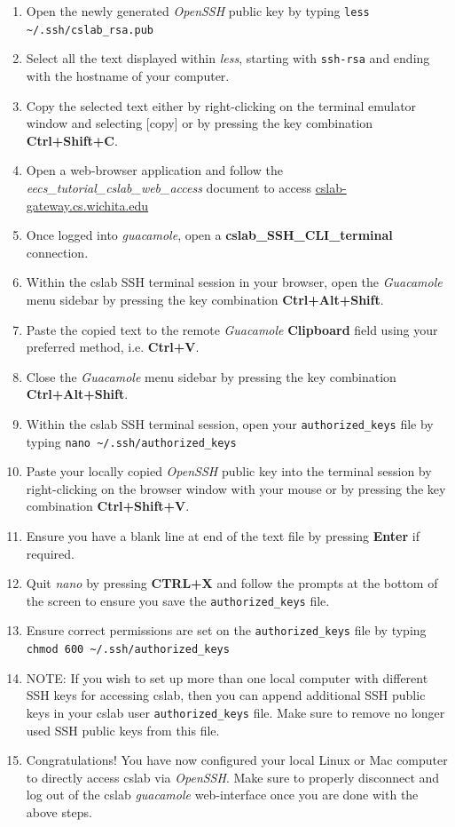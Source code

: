 \documentclass[12pt]{article}
\begin{document}
\begin{flushleft}
\begin{enumerate}
  \item Open the newly generated \textit{OpenSSH} public key by typing \break
    \verb|less ~/.ssh/cslab_rsa.pub|
  \item Select all the text displayed within \textit{less}, starting with \texttt{ssh-rsa} and ending with the hostname of your computer.
  \item Copy the selected text either by right-clicking on the terminal emulator window and selecting [copy] or by pressing the key combination \textbf{Ctrl+Shift+C}.
  \item Open a web-browser application and follow the \textit{eecs\_tutorial\_cslab\_web\_access} document to access \href{https://cslab-gateway.cs.wichita.edu/}{cslab-gateway.cs.wichita.edu}
  \item Once logged into \textit{guacamole}, open a \textbf{cslab\_SSH\_CLI\_terminal} connection.
  \item Within the cslab SSH terminal session in your browser, open the \textit{Guacamole} menu sidebar by pressing the key combination \textbf{Ctrl+Alt+Shift}.
  \item Paste the copied text to the remote \textit{Guacamole} \textbf{Clipboard} field using your preferred method, i.e. \textbf{Ctrl+V}.
  \item Close the \textit{Guacamole} menu sidebar by pressing the key combination \textbf{Ctrl+Alt+Shift}.
  \item Within the cslab SSH terminal session, open your \texttt{authorized\_keys} file by typing \break
  \verb|nano ~/.ssh/authorized_keys|
  \item Paste your locally copied \textit{OpenSSH} public key into the terminal session by right-clicking on the browser window with your mouse or by pressing the key combination \textbf{Ctrl+Shift+V}.
  \item Ensure you have a blank line at end of the text file by pressing \textbf{Enter} if required.
  \item Quit \textit{nano} by pressing \textbf{CTRL+X} and follow the prompts at the bottom of the screen to ensure you save the \verb|authorized_keys| file.
  \item Ensure correct permissions are set on the \verb|authorized_keys| file by typing \break
    \verb|chmod 600 ~/.ssh/authorized_keys|
  \item NOTE: If you wish to set up more than one local computer with different SSH keys for accessing cslab, then you can append additional SSH public keys in your cslab user \verb|authorized_keys| file. Make sure to remove no longer used SSH public keys from this file.
  \item Congratulations! You have now configured your local Linux or Mac computer to directly access cslab via \textit{OpenSSH}. Make sure to properly disconnect and log out of the cslab \textit{guacamole} web-interface once you are done with the above steps.
\end{enumerate}


\end{flushleft}
\end{document}
